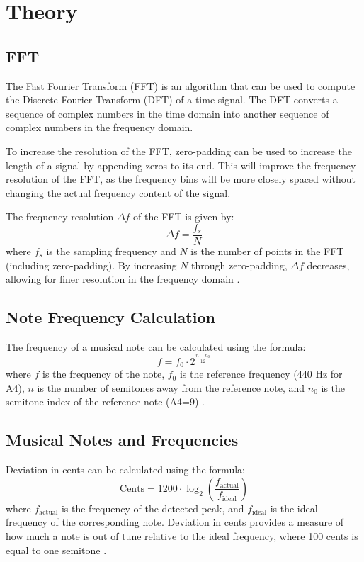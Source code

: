 \chapter{Theory}

\section{FFT} 

The Fast Fourier Transform (FFT) is an algorithm that can be used to compute the Discrete Fourier Transform (DFT) of a time signal. The DFT converts a sequence of complex numbers in the time domain into another sequence of complex numbers in the frequency domain. 

To increase the resolution of the FFT, zero-padding can be used to increase the length of a signal by appending zeros to its end. This will improve the frequency resolution of the FFT, as the frequency bins will be more closely spaced without changing the actual frequency content of the signal. 

The frequency resolution \( \Delta f \) of the FFT is given by:
\begin{equation}
\Delta f = \frac{f_s}{N}
\label{eq:freq_resolution}
\end{equation}
where \( f_s \) is the sampling frequency and \( N \) is the number of points in the FFT (including zero-padding). By increasing \( N \) through zero-padding, \( \Delta f \) decreases, allowing for finer resolution in the frequency domain \cite{Svensson2025}. 


\section{Note Frequency Calculation}

The frequency of a musical note can be calculated using the formula:
\begin{equation}
f = f_0 \cdot 2^{\frac{n - n_0}{12}}
\label{eq:note_freq}
\end{equation}
where \( f \) is the frequency of the note, \( f_0 \) is the reference frequency (440 Hz for A4), \( n \) is the number of semitones away from the reference note, and \( n_0 \) is the semitone index of the reference note (A4=9) \cite{Svensson2025}.


\section{Musical Notes and Frequencies}

Deviation in cents can be calculated using the formula:
\begin{equation}
\text{Cents} = 1200 \cdot \log_2\left(\frac{f_{\text{actual}}}{f_{\text{ideal}}}\right)
\label{eq:deviation_cents}
\end{equation}
where \( f_{\text{actual}} \) is the frequency of the detected peak, and \( f_{\text{ideal}} \) is the ideal frequency of the corresponding note. Deviation in cents provides a measure of how much a note is out of tune relative to the ideal frequency, where 100 cents is equal to one semitone \cite{Svensson2025}.
